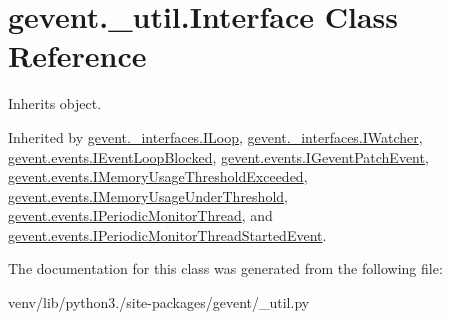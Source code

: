 \hypertarget{classgevent_1_1__util_1_1_interface}{}\section{gevent.\+\_\+util.\+Interface Class Reference}
\label{classgevent_1_1__util_1_1_interface}


Inherits object.



Inherited by \hyperlink{classgevent_1_1__interfaces_1_1_i_loop}{gevent.\+\_\+interfaces.\+I\+Loop}, \hyperlink{classgevent_1_1__interfaces_1_1_i_watcher}{gevent.\+\_\+interfaces.\+I\+Watcher}, \hyperlink{classgevent_1_1events_1_1_i_event_loop_blocked}{gevent.\+events.\+I\+Event\+Loop\+Blocked}, \hyperlink{classgevent_1_1events_1_1_i_gevent_patch_event}{gevent.\+events.\+I\+Gevent\+Patch\+Event}, \hyperlink{classgevent_1_1events_1_1_i_memory_usage_threshold_exceeded}{gevent.\+events.\+I\+Memory\+Usage\+Threshold\+Exceeded}, \hyperlink{classgevent_1_1events_1_1_i_memory_usage_under_threshold}{gevent.\+events.\+I\+Memory\+Usage\+Under\+Threshold}, \hyperlink{classgevent_1_1events_1_1_i_periodic_monitor_thread}{gevent.\+events.\+I\+Periodic\+Monitor\+Thread}, and \hyperlink{classgevent_1_1events_1_1_i_periodic_monitor_thread_started_event}{gevent.\+events.\+I\+Periodic\+Monitor\+Thread\+Started\+Event}.



The documentation for this class was generated from the following file\+:\begin{DoxyCompactItemize}
\item 
venv/lib/python3./site-\/packages/gevent/\+\_\+util.\+py\end{DoxyCompactItemize}
